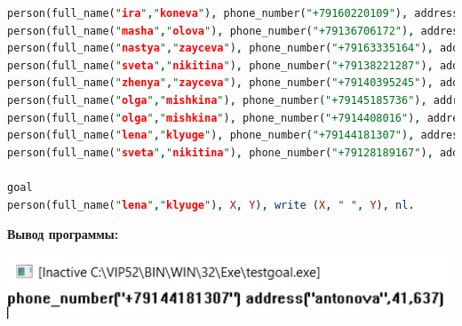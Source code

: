 \begin{lstlisting}[language=prolog,label=some-code1,caption=Задание 1]
person(full_name("ira","koneva"), phone_number("+79160220109"), address("antonova", 6, 900)).
person(full_name("masha","olova"), phone_number("+79136706172"), address("gadjieva", 17, 1111)).
person(full_name("nastya","zayceva"), phone_number("+79163335164"), address("lermontovskiy pr.", 16, 266)).
person(full_name("sveta","nikitina"), phone_number("+79138221287"), address("antonova", 17, 264)).
person(full_name("zhenya","zayceva"), phone_number("+79140395245"), address("antonova", 88, 221)).
person(full_name("olga","mishkina"), phone_number("+79145185736"), address("venevskaya", 91, 188)).
person(full_name("olga","mishkina"), phone_number("+7914408016"), address("varshavshkoe sh.", 53, 977)).
person(full_name("lena","klyuge"), phone_number("+79144181307"), address("antonova", 41, 637)).
person(full_name("sveta","nikitina"), phone_number("+79128189167"), address("antonova", 31, 1275)).

goal 
person(full_name("lena","klyuge"), X, Y), write (X, " ", Y), nl.
\end{lstlisting} 
\textbf{Вывод программы:}

\includegraphics{"img/Screenshot_1.png"}


    